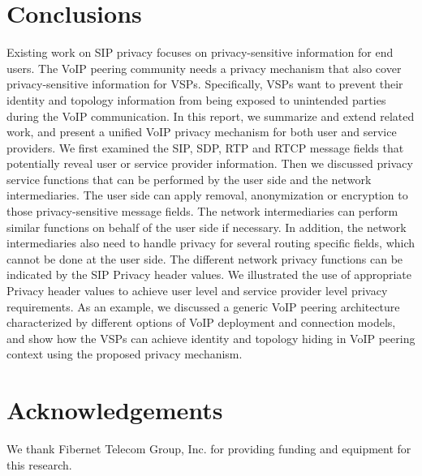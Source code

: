 \documentclass[letterpaper,notitlepage,times,12pt]{article}
\begin{document}
\section{Conclusions} \label{sec:conclusion}

Existing work on SIP privacy focuses on privacy-sensitive information for end users. The VoIP peering community needs a privacy mechanism that also cover privacy-sensitive information for VSPs. Specifically, VSPs want to prevent their identity and topology information from being exposed to unintended parties during the VoIP communication. In this report, we summarize and extend related work, and present a unified VoIP privacy mechanism for both user and service providers. We first examined the SIP, SDP, RTP and RTCP message fields that potentially reveal user or service provider information. Then we discussed privacy service functions that can be performed by the user side and the network intermediaries. The user side can apply removal, anonymization or encryption to those privacy-sensitive message fields. The network intermediaries can perform similar functions on behalf of the user side if necessary. In addition, the network intermediaries also need to handle privacy for several routing specific fields, which cannot be done at the user side. The different network privacy functions can be indicated by the SIP {\sf Privacy} header values. We illustrated the use of appropriate {\sf Privacy} header values to achieve user level and service provider level privacy requirements. As an example, we discussed a generic VoIP peering architecture characterized by different options of VoIP deployment and connection models, and show how the VSPs can achieve identity and topology hiding in VoIP peering context using the proposed privacy mechanism.


\section{Acknowledgements}

We thank Fibernet Telecom Group, Inc. for providing funding and equipment for this research.




\end{document}
